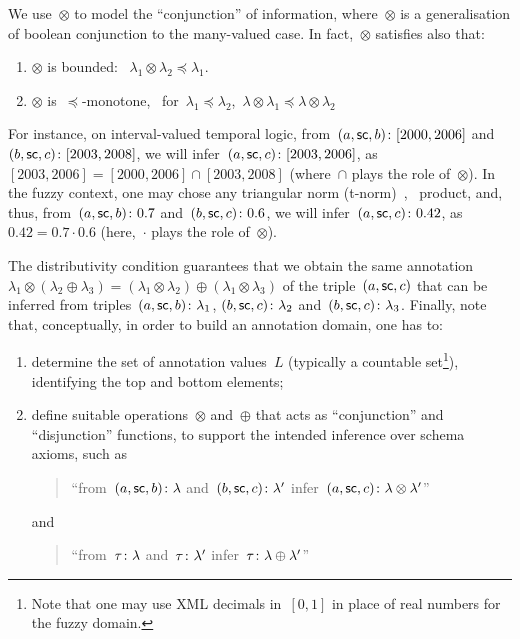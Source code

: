 We use~$\otimes$ to model the ``conjunction'' of information, where~$\otimes$ is a generalisation of boolean conjunction
to the many-valued case. In fact,~$\otimes$ satisfies also that:
%
\begin{enumerate}[noitemsep]
\item $\otimes$ is bounded: \ie~$\lambda_{1} \otimes \lambda_{2} \preceq \lambda_{1}$.
\item $\otimes$ is~$\preceq$-monotone, \ie~for~$\lambda_{1} \preceq \lambda_{2}$,~$\lambda \otimes \lambda_{1} \preceq
  \lambda \otimes \lambda_{2}$
\end{enumerate}
%
For instance, on interval-valued temporal logic, from~$\mbox{$(a, \mathsf{sc}, b)\colon[2000,2006]$}$ and
$\mbox{$(b, \mathsf{sc}, c)\colon[2003,2008]$}$, we will infer~$\mbox{$(a, \mathsf{sc}, c)\colon[2003,2006]$}$, as
$[2003,2006] = [2000,2006] \cap [2003,2008]$ (where~$\cap$ plays the role of~$\otimes$).
%
In the fuzzy context, one may chose any triangular norm (t-norm)~\cite{KlementMesiarPap:2000aa}, \eg~product, and, thus,
from~$\mbox{$(a, \mathsf{sc}, b)\colon0.7$}$ and~$\mbox{$(b, \mathsf{sc}, c)\colon0.6$}$, we will
infer~$\mbox{$(a, \mathsf{sc}, c)\colon0.42$}$, as $0.42 = 0.7 \cdot 0.6$ (here,~$\cdot$ plays the role of~$\otimes$).

The distributivity condition guarantees that we obtain the same annotation~$\lambda_{1} \otimes (\lambda_{2} \oplus
\lambda_{3}) = (\lambda_{1} \otimes \lambda_{2}) \oplus (\lambda_{1} \otimes \lambda_{3})$ of the triple~$(a,
  \mathsf{sc}, c)$ that can be inferred from triples~$\mbox{$(a, \mathsf{sc}, b)\colon\lambda_{1}$}$, $\mbox{$(b,
    \mathsf{sc}, c)\colon\lambda_{2}$}$ and~$\mbox{$(b, \mathsf{sc}, c)\colon\lambda_{3}$}$.
%
Finally, note that, conceptually, in order to build an annotation domain, one has to:
% 
\begin{enumerate}[noitemsep]
\item determine the set of annotation values~$L$ (typically a countable set\footnote{Note that one may use \ac{XML}
    decimals in~$[0,1]$ in place of real numbers for the fuzzy domain.}),
  identifying the top and bottom elements;

\item define suitable operations~$\otimes$ and~$\oplus$ that acts as ``conjunction'' and ``disjunction'' functions, to
  support the intended inference over schema axioms, such as
  \begin{quote}
    ``from~$\mbox{$(a, \mathsf{sc}, b)\colon\lambda$}$ and~$\mbox{$(b, \mathsf{sc},
        c)\colon\lambda'$}$ infer~$\mbox{$(a, \mathsf{sc}, c)\colon\lambda \otimes \lambda'$}$''
  \end{quote}

  \nd and
  \begin{quote}
    ``from~$\mbox{$\tau\colon\lambda$}$ and~$\mbox{$\tau\colon\lambda'$}$ infer~$\mbox{$\tau\colon\lambda \oplus \lambda'$}$''
  \end{quote}
\end{enumerate}

